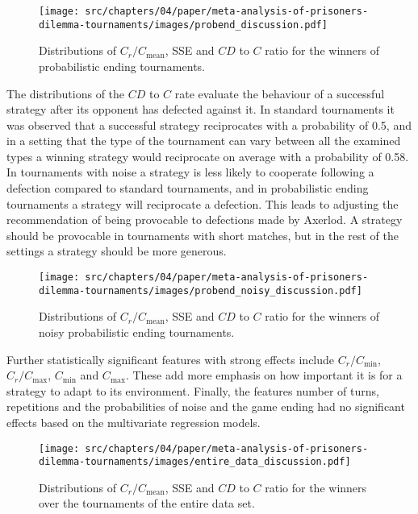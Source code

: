 \begin{figure}[!htbp]
    \centering
        \centering
        \texttt{[image: src/chapters/04/paper/meta-analysis-of-prisoners-dilemma-tournaments/images/probend\_discussion.pdf]}
        \caption{Distributions of \(C_r / C_{\text{mean}}\), SSE and \(CD\) to \(C\) ratio
        for the winners of probabilistic ending tournaments.}
        \label{fig:discussion_probend}
\end{figure}

The distributions of the \(CD\) to \(C\) rate evaluate the behaviour of a
successful strategy after its opponent has defected against it. In standard
tournaments it was observed that a successful strategy reciprocates with a
probability of 0.5, and in a setting that the type
of the tournament can vary between all the examined types a winning strategy
would reciprocate on average with a probability of 0.58. In
tournaments with noise a strategy is less likely to cooperate following a
defection compared to standard tournaments, and in probabilistic ending
tournaments a strategy will reciprocate a defection.
This leads to adjusting the recommendation of being provocable to defections made
by Axerlod. A strategy should be provocable in tournaments with short matches,
but in the rest of the settings a strategy should be more generous.

\begin{figure}[!htbp]
    \centering
        \centering
        \texttt{[image: src/chapters/04/paper/meta-analysis-of-prisoners-dilemma-tournaments/images/probend\_noisy\_discussion.pdf]}
        \caption{Distributions of \(C_r / C_{\text{mean}}\), SSE and \(CD\) to \(C\) ratio
        for the winners of noisy probabilistic ending tournaments.}
        \label{fig:discussion_probend_noisy}
\end{figure}

Further statistically significant features with strong effects include \(C_r /
C_{\text{min}}\), \(C_r / C_{\text{max}}\), \(C_{\text{min}}\) and
\(C_{\text{max}}\). These add more emphasis on how important it is for a
strategy to adapt to its environment. Finally, the features number of turns,
repetitions and the probabilities of noise and the game ending had no
significant effects based on the multivariate regression models.

\begin{figure}[!htbp]
    \centering
        \centering
        \texttt{[image: src/chapters/04/paper/meta-analysis-of-prisoners-dilemma-tournaments/images/entire\_data\_discussion.pdf]}
        \caption{Distributions of \(C_r / C_{\text{mean}}\), SSE and \(CD\) to \(C\) ratio
        for the winners over the tournaments of the entire data set.}
        \label{fig:discussion_entire_data}
\end{figure}

